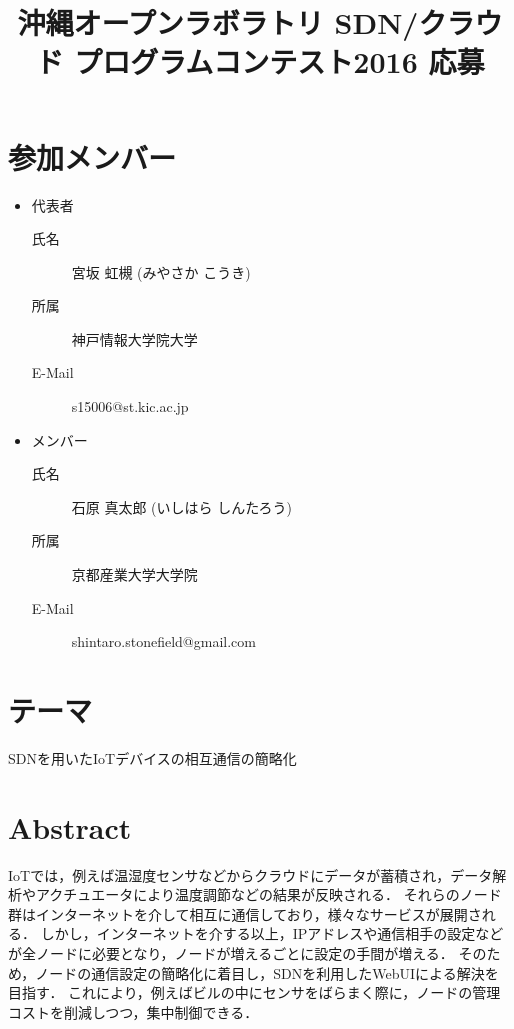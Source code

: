 \documentclass{jsarticle}
\begin{document}
\title{沖縄オープンラボラトリ SDN/クラウド プログラムコンテスト2016 応募}
\maketitle

\section{参加メンバー}
\begin{itemize}
	\item 代表者
		\begin{description}
			\item[氏名] 宮坂 虹槻 (みやさか こうき)
			\item[所属] 神戸情報大学院大学
			\item[E-Mail] s15006@st.kic.ac.jp
		\end{description}
	\item メンバー
		\begin{description}
			\item[氏名] 石原 真太郎 (いしはら しんたろう)
			\item[所属] 京都産業大学大学院
			\item[E-Mail] shintaro.stonefield@gmail.com
		\end{description}
\end{itemize}

\section{テーマ}
	SDNを用いたIoTデバイスの相互通信の簡略化

\section{Abstract}
IoTでは，例えば温湿度センサなどからクラウドにデータが蓄積され，データ解析やアクチュエータにより温度調節などの結果が反映される．
それらのノード群はインターネットを介して相互に通信しており，様々なサービスが展開される．
しかし，インターネットを介する以上，IPアドレスや通信相手の設定などが全ノードに必要となり，ノードが増えるごとに設定の手間が増える．
そのため，ノードの通信設定の簡略化に着目し，SDNを利用したWebUIによる解決を目指す．
これにより，例えばビルの中にセンサをばらまく際に，ノードの管理コストを削減しつつ，集中制御できる．
\end{document}
